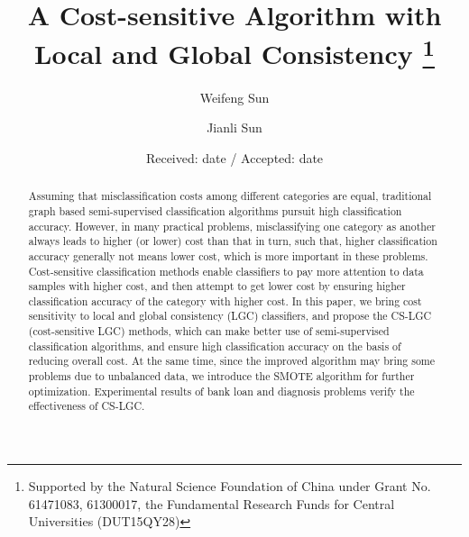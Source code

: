 \documentclass{svjour3}                     %
\begin{document}
\title{A Cost-sensitive Algorithm with Local and Global Consistency
\thanks{Supported by the Natural Science Foundation of China under Grant No. 61471083, 61300017, the Fundamental Research Funds for Central Universities (DUT15QY28)}}
\subtitle{}


\author{Weifeng Sun       \and
        Jianli Sun %
}



\date{Received: date / Accepted: date}



\maketitle
\begin{abstract}
Assuming that misclassification costs among different categories are equal, traditional graph based semi-supervised classification algorithms pursuit high classification accuracy. However, in many practical problems, misclassifying one category as another always leads to higher (or lower) cost than that in turn, such that, higher classification accuracy generally not means lower cost, which is more important in these problems. Cost-sensitive classification methods enable classifiers to pay more attention to data samples with higher cost, and then attempt to get lower cost by ensuring higher classification accuracy of the category with higher cost. In this paper, we bring cost sensitivity to local and global consistency (LGC) classifiers, and propose the CS-LGC (cost-sensitive LGC) methods, which can make better use of semi-supervised classification algorithms, and ensure high classification accuracy on the basis of reducing overall cost. At the same time, since the improved algorithm may bring some problems due to unbalanced data, we introduce the SMOTE algorithm for further optimization. Experimental results of bank loan and diagnosis problems verify the effectiveness of CS-LGC.
\end{abstract}
\end{document}
